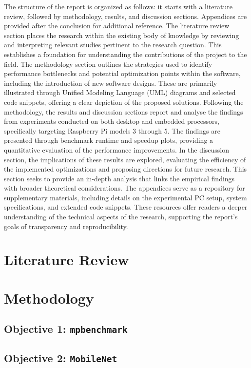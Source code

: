 \documentclass[12pt]{article}
\begin{document}
The structure of the report is organized as follows: it starts with a literature review, followed by methodology, results, and discussion sections. Appendices are provided after the conclusion for additional reference. The literature review section places the research within the existing body of knowledge by reviewing and interpreting relevant studies pertinent to the research question. This establishes a foundation for understanding the contributions of the project to the field. The methodology section outlines the strategies used to identify performance bottlenecks and potential optimization points within the software, including the introduction of new software designs. These are primarily illustrated through Unified Modeling Language (UML) diagrams and selected code snippets, offering a clear depiction of the proposed solutions. Following the methodology, the results and discussion sections report and analyse the findings from experiments conducted on both desktop and embedded processors, specifically targeting Raspberry Pi models 3 through 5. The findings are presented through benchmark runtime and speedup plots, providing a quantitative evaluation of the performance improvements. In the discussion section, the implications of these results are explored, evaluating the efficiency of the implemented optimizations and proposing directions for future research. This section seeks to provide an in-depth analysis that links the empirical findings with broader theoretical considerations. The appendices serve as a repository for supplementary materials, including details on the experimental PC setup, system specifications, and extended code snippets. These resources offer readers a deeper understanding of the technical aspects of the research, supporting the report's goals of transparency and reproducibility. 

\newpage
\section{Literature Review}


\section{Methodology}

\subsection{Objective 1: \texttt{mpbenchmark}}
\subsection{Objective 2: \texttt{MobileNet}}
\end{document}
